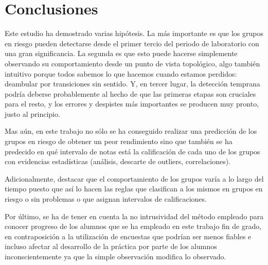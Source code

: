 \chapter{Conclusiones}\label{sec:chapterXIV}

Este estudio ha demostrado varias hipótesis. La más importante es que los grupos en riesgo pueden detectarse desde el primer tercio del periodo de laboratorio con una gran significancia. La segunda es que esto puede hacerse simplemente observando su comportamiento desde un punto de vista topológico, algo también intuitivo porque todos sabemos lo que hacemos cuando estamos perdidos: deambular por transiciones sin sentido. Y, en tercer lugar, la detección temprana podría deberse probablemente al hecho de que las primeras etapas son cruciales para el resto, y los errores y despistes más importantes se producen muy pronto, justo al principio.

Mas aún, en este trabajo no sólo se ha conseguido realizar una predicción de los grupos en riesgo de obtener un peor rendimiento sino que también se ha predecido en qué intervalo de notas está la calificación de cada uno de los grupos con evidencias estadísticas (análisis, descarte de outliers, correlaciones).

Adicionalmente, destacar que el comportamiento de los grupos varía a lo largo del tiempo puesto que así lo hacen las reglas que clasifican a los mismos en grupos en riesgo o sin problemas o que asignan intervalos de calificaciones.

Por último, se ha de tener en cuenta la no intrusividad del método empleado para conocer progreso de los alumnos que se ha empleado en este trabajo fin de grado, en contraposición a la utilización de encuestas que podrían ser menos fiables e incluso afectar al desarrollo de la práctica por parte de los alumnos inconscientemente ya que la simple observación modifica lo observado.